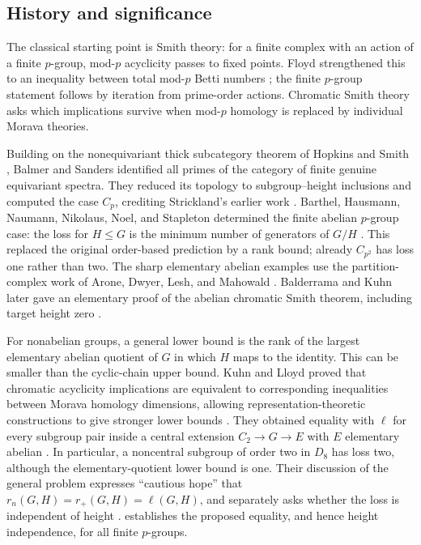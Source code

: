 \subsection*{History and significance}

The classical starting point is Smith theory: for a finite complex with
an action of a finite \(p\)-group, mod-\(p\) acyclicity passes to fixed
points. Floyd strengthened this to an inequality between total
mod-\(p\) Betti numbers \cite[Theorem~4.4]{Floyd}; the finite
\(p\)-group statement follows by iteration from prime-order actions.
Chromatic Smith theory asks which implications survive when mod-\(p\)
homology is replaced by individual Morava theories.

Building on the nonequivariant thick subcategory theorem of Hopkins
and Smith \cite{HS}, Balmer and Sanders identified all primes of the
category of finite genuine equivariant spectra. They reduced its
topology to subgroup--height inclusions and computed the case
\(C_p\), crediting Strickland's earlier work
\cite[Introduction, Theorems~4.9 and~4.14, and Section~7]{BS}.
Barthel, Hausmann, Naumann, Nikolaus, Noel, and Stapleton determined
the finite abelian \(p\)-group case: the loss for \(H\le G\) is the minimum
number of generators of \(G/H\) \cite[Theorem~2.3]{BHNNNS}.
This replaced the original order-based prediction by a rank bound;
already \(C_{p^2}\) has loss one rather than two.
The sharp elementary abelian examples use the partition-complex work
of Arone, Dwyer, Lesh, and Mahowald
\cite[Theorems~2.2 and~4.1]{BHNNNS}. Balderrama and Kuhn later gave
an elementary proof of the abelian chromatic Smith theorem, including
target height zero \cite[Theorem~1.1 and Section~3.2]{BK}.

For nonabelian groups, a general lower bound is the rank of
the largest elementary abelian quotient of \(G\) in which \(H\)
maps to the identity. This can be smaller than the cyclic-chain upper
bound. Kuhn and Lloyd proved that chromatic acyclicity implications
are equivalent to corresponding inequalities between Morava homology
dimensions, allowing representation-theoretic constructions to give
stronger lower bounds \cite[Theorem~2.2]{KL}. They obtained equality
with \(\ell\) for every subgroup pair inside a central extension
\(C_2\to G\to E\) with \(E\) elementary abelian
\cite[Theorem~2.13]{KL}. In particular, a noncentral subgroup of order
two in \(D_8\) has loss two, although the elementary-quotient lower
bound is one. Their discussion of the general problem expresses
``cautious hope'' that \(r_n(G,H)=r_+(G,H)=\ell(G,H)\), and separately
asks whether the loss is independent of height
\cite[Section~2.2]{KL}.  establishes the proposed
equality, and hence height independence, for all finite \(p\)-groups.

